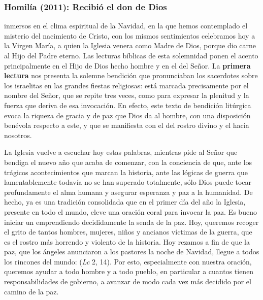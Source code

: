 \subsubsection{Homilía (2011): Recibió el don de Dios}


\begin{body}
	 inmersos en el clima espiritual de la Navidad, en la que hemos contemplado el misterio del nacimiento de Cristo, con los mismos sentimientos celebramos hoy a la Virgen María, a quien la Iglesia venera como Madre de Dios, porque dio carne al Hijo del Padre eterno. Las lecturas bíblicas de esta solemnidad ponen el acento principalmente en el Hijo de Dios hecho hombre y en el  del Señor. La \textbf{primera lectura} nos presenta la solemne bendición que pronunciaban los sacerdotes sobre los israelitas en las grandes fiestas religiosas: está marcada precisamente por el nombre del Señor, que se repite tres veces, como para expresar la plenitud y la fuerza que deriva de esa invocación. En efecto, este texto de bendición litúrgica evoca la riqueza de gracia y de paz que Dios da al hombre, con una disposición benévola respecto a este, y que se manifiesta con el  del rostro divino y el  hacia nosotros.
	
	La Iglesia vuelve a escuchar hoy estas palabras, mientras pide al Señor que bendiga el nuevo año que acaba de comenzar, con la conciencia de que, ante los trágicos acontecimientos que marcan la historia, ante las lógicas de guerra que lamentablemente todavía no se han superado totalmente, sólo Dios puede tocar profundamente el alma humana y asegurar esperanza y paz a la humanidad. De hecho, ya es una tradición consolidada que en el primer día del año la Iglesia, presente en todo el mundo, eleve una oración coral para invocar la paz. Es bueno iniciar un emprendiendo decididamente la senda de la paz. Hoy, queremos recoger el grito de tantos hombres, mujeres, niños y ancianos víctimas de la guerra, que es el rostro más horrendo y violento de la historia. Hoy rezamos a fin de que la paz, que los ángeles anunciaron a los pastores la noche de Navidad, llegue a todos los rincones del mundo:  (\emph{Lc} 2, 14). Por esto, especialmente con nuestra oración, queremos ayudar a todo hombre y a todo pueblo, en particular a cuantos tienen responsabilidades de gobierno, a avanzar de modo cada vez más decidido por el camino de la paz.
	

\end{body}
